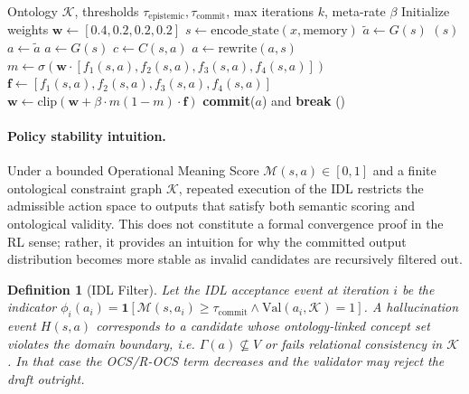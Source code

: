 \documentclass[11pt,a4paper]{article}
\newtheorem{definition}{Definition}
\begin{document}
\begin{algorithm}[h]
\caption{ECL-Gated IDL Inference Loop with Adaptive Semantic Scoring}
\label{alg:mdrl}
\begin{algorithmic}[1]
\Require Ontology $\mathcal{K}$, thresholds $\tau_{\text{epistemic}}, \tau_{\text{commit}}$, max iterations $k$, meta-rate $\beta$
\State Initialize weights $\mathbf{w} \leftarrow [0.4, 0.2, 0.2, 0.2]$
    \State $s \leftarrow \text{encode\_state}(x, \text{memory})$
    \State $\tilde{a} \leftarrow G(s)$ 
        \State \Return {}$(s)$
    \EndIf
            \State $a \leftarrow \tilde{a}$
        \Else
            \State $a \leftarrow G(s)$
        \EndIf
        \State $c \leftarrow C(s, a)$ 
            \State $a \leftarrow \text{rewrite}(a, s)$ 
        \EndIf
        \State $m \leftarrow \sigma(\mathbf{w} \cdot [f_1(s,a), f_2(s,a), f_3(s,a), f_4(s,a)])$
        \State $\mathbf{f} \leftarrow [f_1(s,a), f_2(s,a), f_3(s,a), f_4(s,a)]$
            \State $\mathbf{w} \leftarrow \text{clip}(\mathbf{w} + \beta \cdot m(1-m) \cdot \mathbf{f})$ 
            \State \textbf{commit}($a$) and \textbf{break}
        \EndIf
    \EndFor
        \State \Return {}()
    \EndIf
\EndFor
\end{algorithmic}
\end{algorithm}

\paragraph{Policy stability intuition.}
Under a bounded Operational Meaning Score $\mathcal{M}(s,a) \in [0,1]$ and a finite ontological constraint graph $\mathcal{K}$, repeated execution of the IDL restricts the admissible action space to outputs that satisfy both semantic scoring and ontological validity. This does not constitute a formal convergence proof in the RL sense; rather, it provides an intuition for why the committed output distribution becomes more stable as invalid candidates are recursively filtered out.

\begin{definition}[IDL Filter]
\label{def:filter}
Let the IDL acceptance event at iteration $i$ be the indicator $\phi_i(a_i) = \mathbf{1}[\mathcal{M}(s,a_i) \geq \tau_{\text{commit}} \wedge \mathrm{Val}(a_i,\mathcal{K})=1]$. A hallucination event $H(s,a)$ corresponds to a candidate whose ontology-linked concept set violates the domain boundary, i.e. $\Gamma(a) \nsubseteq V$ or fails relational consistency in $\mathcal{K}$. In that case the OCS/R-OCS term decreases and the validator may reject the draft outright.
\end{definition}
\end{document}
